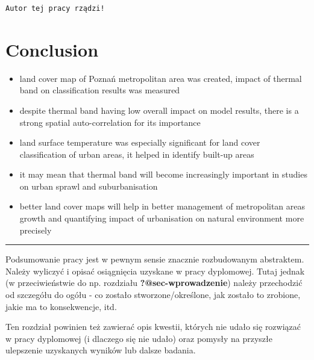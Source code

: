 \documentclass{amuthesis}
\begin{document}
\begin{verbatim}
Autor tej pracy rządzi!
\end{verbatim}


\hypertarget{conclusion}{%
\chapter{Conclusion}\label{conclusion}}

\begin{itemize}
\item
  land cover map of Poznań metropolitan area was created, impact of
  thermal band on classification results was measured
\item
  despite thermal band having low overall impact on model results, there
  is a strong spatial auto-correlation for its importance
\item
  land surface temperature was especially significant for land cover
  classification of urban areas, it helped in identify built-up areas
\item
  it may mean that thermal band will become increasingly important in
  studies on urban sprawl and suburbanisation
\item
  better land cover maps will help in better management of metropolitan
  areas growth and quantifying impact of urbanisation on natural
  environment more precisely
\end{itemize}

\begin{center}\rule{0.5\linewidth}{0.5pt}\end{center}

Podsumowanie pracy jest w pewnym sensie znacznie rozbudowanym
abstraktem. Należy wyliczyć i opisać osiągnięcia uzyskane w pracy
dyplomowej. Tutaj jednak (w przeciwieństwie do np. rozdziału
\textbf{?@sec-wprowadzenie}) należy przechodzić od szczegółu do ogółu -
co zostało stworzone/określone, jak zostało to zrobione, jakie ma to
konsekwencje, itd.

Ten rozdział powinien też zawierać opis kwestii, których nie udało się
rozwiązać w pracy dyplomowej (i dlaczego się nie udało) oraz pomysły na
przyszłe ulepszenie uzyskanych wyników lub dalsze badania.

\printbibliography[heading=bibintoc, title=Bibliography]
\end{document}
